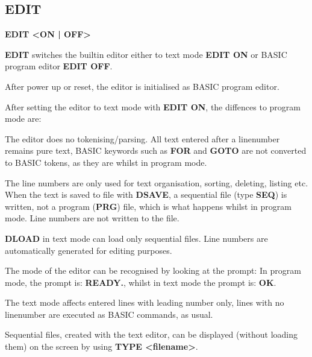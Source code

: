 \subsection{EDIT}
\begin{description}[leftmargin=2cm,style=nextline]
\item [Format:] {\bf EDIT <ON | OFF>}

\item [Usage:]  {\bf EDIT} switches the builtin editor
               either to text mode {\bf EDIT ON}
               or BASIC program editor {\bf EDIT OFF}.

               After power up or reset, the editor
               is initialised as BASIC program editor.

               After setting the editor to text mode with
               {\bf EDIT ON}, the diffences to program mode are:

               The editor does no tokenising/parsing.
               All text entered after a linenumber remains pure text,
               BASIC keywords such as {\bf FOR} and {\bf GOTO} are not
               converted to BASIC tokens, as they are whilst in program mode.

               The line numbers are only used for text organisation,
               sorting, deleting, listing etc.
               When the text is saved to file with {\bf DSAVE},
               a sequential file (type {\bf SEQ}) is written, not a
               program ({\bf PRG}) file, which is what happens whilst in program mode.
               Line numbers are not written to the file.

               {\bf DLOAD} in text mode can load only sequential files.
               Line numbers are automatically generated for editing purposes.

               The mode of the editor can be recognised by looking at the prompt:
               In program mode, the prompt is: {\bf READY.}, whilst in text mode
               the prompt is: {\bf OK}.

               The text mode affects entered lines with leading number only,
               lines with no linenumber are executed as BASIC commands,
               as usual.

               Sequential files, created with the text editor, can be displayed
               (without loading them)
               on the screen by using {\bf TYPE <filename>}.

\newpage


\end{description}
